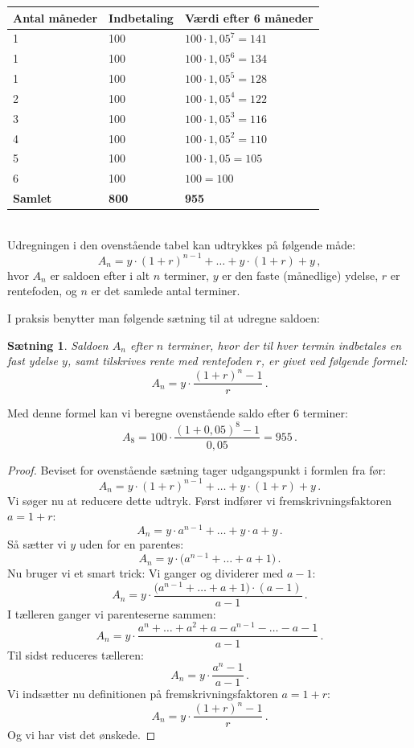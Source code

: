 \documentclass[12pt,oneside,a4paper]{article}
\newtheorem{thm}{Sætning}[section]
\begin{document}
\begin{tabular}{|l|l|l|}
    \hline
    \textbf{Antal måneder} & \textbf{Indbetaling} & \textbf{Værdi efter 6 måneder} \\
    \hline
    1 & 100 & $100 \cdot 1,05^7 = 141$ \\
    \hline
    1 & 100 & $100 \cdot 1,05^6 = 134$ \\
    \hline
    1 & 100 & $100 \cdot 1,05^5 = 128$ \\
    \hline
    2 & 100 & $100 \cdot 1,05^4 = 122$ \\
    \hline
    3 & 100 & $100 \cdot 1,05^3 = 116$ \\
    \hline
    4 & 100 & $100 \cdot 1,05^2 = 110$ \\
    \hline
    5 & 100 & $100 \cdot 1,05 = 105$ \\
    \hline
    6 & 100 & $100 = 100$ \\
    \hline
    \textbf{Samlet} & \textbf{800} & \textbf{955} \\
    \hline
\end{tabular}
\\

Udregningen i den ovenstående tabel kan udtrykkes på følgende måde:
\[
A_n = y\cdot(1+r)^{n-1} + \ldots + y\cdot(1+r) + y \,,
\]
hvor $A_n$ er saldoen efter i alt $n$ terminer,  $y$ er den faste (månedlige)
ydelse, $r$ er rentefoden, og $n$ er det samlede antal terminer.

I praksis benytter man følgende sætning til at udregne saldoen:
\begin{tcolorbox}
\begin{thm}
Saldoen $A_n$ efter $n$ terminer, hvor der til hver termin indbetales en fast ydelse $y$,
samt tilskrives rente med rentefoden $r$, er givet ved følgende formel:
\[
A_n = y\cdot\frac{(1+r)^n-1}{r}\,.
\]
\end{thm}
\end{tcolorbox}

Med denne formel kan vi beregne ovenstående saldo efter 6 terminer:
\[
A_8 = 100\cdot\frac{(1+0,05)^8-1}{0,05} = 955 \,.
\]

\begin{tcolorbox}
\begin{proof}
Beviset for ovenstående sætning tager udgangspunkt i formlen fra før:
\[
A_n = y\cdot(1+r)^{n-1} + \ldots + y\cdot(1+r) + y \,.
\]
Vi søger nu at reducere dette udtryk. Først indfører vi fremskrivningsfaktoren $a=1+r$:
\[
A_n = y\cdot a^{n-1} + \ldots + y\cdot a + y \,.
\]
Så sætter vi $y$ uden for en parentes:
\[
A_n = y\cdot\big(a^{n-1} + \ldots + a + 1\big) \,.
\]
Nu bruger vi et smart trick: Vi ganger og dividerer med $a-1$:
\[
A_n = y\cdot\frac{\big(a^{n-1} + \ldots + a + 1\big)\cdot(a-1)}{a-1} \,.
\]
I tælleren ganger vi parenteserne sammen:
\[
A_n = y\cdot\frac{a^{n} + \ldots + a^2 + a - a^{n-1} - \ldots - a - 1}{a-1} \,.
\]
Til sidst reduceres tælleren:
\[
A_n = y\cdot\frac{a^{n} - 1}{a-1} \,.
\]
Vi indsætter nu definitionen på fremskrivningsfaktoren $a=1+r$:
\[
A_n = y\cdot\frac{(1+r)^{n} - 1}{r} \,.
\]
Og vi har vist det ønskede.
\end{proof}
\end{tcolorbox}
\end{document}

